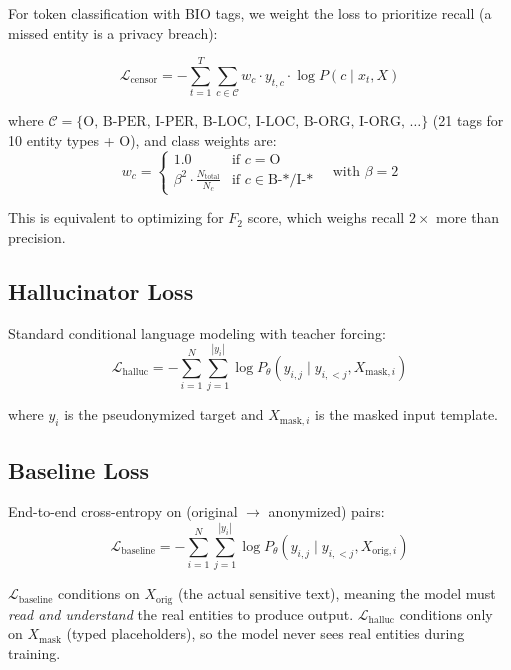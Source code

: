 \documentclass[11pt, a4paper]{article}
\newcommand{\Lcensor}{\mathcal{L}_{\text{censor}}}
\newcommand{\Lhalluc}{\mathcal{L}_{\text{halluc}}}
\newcommand{\Lbaseline}{\mathcal{L}_{\text{baseline}}}
\newcommand{\Xorig}{X_{\text{orig}}}
\newcommand{\Xmask}{X_{\text{mask}}}
\begin{document}
For token classification with BIO tags, we weight the loss to prioritize recall (a missed entity is a privacy breach):

\begin{equation}
\Lcensor = -\sum_{t=1}^{T} \sum_{c \in \mathcal{C}} w_c \cdot y_{t,c} \cdot \log P(c \mid x_t, X)
\end{equation}

where $\mathcal{C} = \{\text{O, B-PER, I-PER, B-LOC, I-LOC, B-ORG, I-ORG, \ldots}\}$ (21 tags for 10 entity types + O), and class weights are:
\begin{equation}
w_c = \begin{cases}
1.0 & \text{if } c = \text{O} \\
\beta^2 \cdot \frac{N_{\text{total}}}{N_c} & \text{if } c \in \text{B-*/I-*}
\end{cases}
\quad \text{with } \beta = 2
\end{equation}

This is equivalent to optimizing for $F_2$ score, which weighs recall $2\times$ more than precision.

\subsection{Hallucinator Loss}

Standard conditional language modeling with teacher forcing:
\begin{equation}
\Lhalluc = -\sum_{i=1}^{N} \sum_{j=1}^{|y_i|} \log P_\theta(y_{i,j} \mid y_{i,<j}, X_{\text{mask},i})
\end{equation}

where $y_i$ is the pseudonymized target and $X_{\text{mask},i}$ is the masked input template.

\subsection{Baseline Loss}

End-to-end cross-entropy on (original $\rightarrow$ anonymized) pairs:
\begin{equation}
\Lbaseline = -\sum_{i=1}^{N} \sum_{j=1}^{|y_i|} \log P_\theta(y_{i,j} \mid y_{i,<j}, X_{\text{orig},i})
\end{equation}

\begin{warningbox}
$\Lbaseline$ conditions on $\Xorig$ (the actual sensitive text), meaning the model must \textit{read and understand} the real entities to produce output. $\Lhalluc$ conditions only on $\Xmask$ (typed placeholders), so the model never sees real entities during training.
\end{warningbox}
\end{document}
